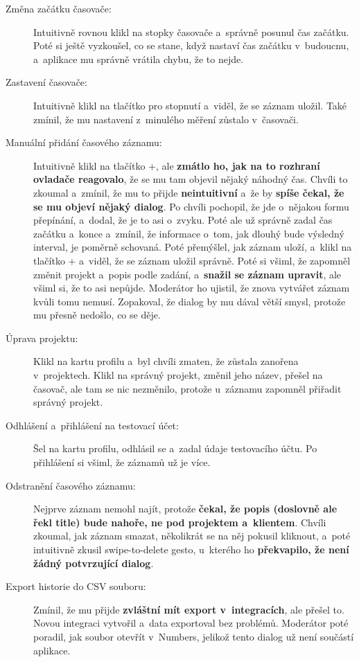 \begin{description}
\item[Změna začátku časovače:] Intuitivně rovnou klikl na stopky časovače a~správně posunul čas začátku. Poté si ještě vyzkoušel, co se stane, když nastaví čas začátku v~budoucnu, a~aplikace mu správně vrátila chybu, že to nejde.
\item[Zastavení časovače:] Intuitivně klikl na tlačítko pro stopnutí a~viděl, že se záznam uložil. Také zmínil, že mu nastavení z~minulého měření zůstalo v~časovači.
\item[Manuální přidání časového záznamu:] Intuitivně klikl na tlačítko +, ale \textbf{zmátlo ho, jak na to rozhraní ovladače reagovalo}, že se mu tam objevil nějaký náhodný čas. Chvíli to zkoumal a~zmínil, že mu to přijde \textbf{neintuitivní} a~že by \textbf{spíše čekal, že se mu objeví nějaký dialog}. Po chvíli pochopil, že jde o~nějakou formu přepínání, a~dodal, že je to asi o~zvyku. Poté ale už správně zadal čas začátku a~konce a~zmínil, že informace o~tom, jak dlouhý bude výsledný interval, je poměrně schovaná. Poté přemýšlel, jak záznam uloží, a~klikl na tlačítko + a~viděl, že se záznam uložil správně. Poté si všiml, že zapomněl změnit projekt a~popis podle zadání, a~\textbf{snažil se záznam upravit}, ale všiml si, že to asi nepůjde. Moderátor ho ujistil, že znova vytvářet záznam kvůli tomu nemusí. Zopakoval, že dialog by mu dával větší smysl, protože mu přesně nedošlo, co se děje.
\item[Úprava projektu:] Klikl na kartu profilu a~byl chvíli zmaten, že zůstala zanořena v~projektech. Klikl na správný projekt, změnil jeho název, přešel na časovač, ale tam se nic nezměnilo, protože u~záznamu zapomněl přiřadit správný projekt. 
\item[Odhlášení a~přihlášení na testovací účet:] Šel na kartu profilu, odhlásil se a~zadal údaje testovacího účtu. Po přihlášení si všiml, že záznamů už je více.
\item[Odstranění časového záznamu:] Nejprve záznam nemohl najít, protože \textbf{čekal, že popis (doslovně ale řekl title) bude nahoře, ne pod projektem a~klientem}. Chvíli zkoumal, jak záznam smazat, několikrát se na něj pokusil kliknout, a~poté intuitivně zkusil swipe-to-delete gesto, u~kterého ho \textbf{překvapilo, že není žádný potvrzující dialog}.
\item[Export historie do CSV souboru:] Zmínil, že mu přijde \textbf{zvláštní mít export v~integracích}, ale přešel to. Novou integraci vytvořil a~data exportoval bez problémů. Moderátor poté poradil, jak soubor otevřít v~Numbers, jelikož tento dialog už není součástí aplikace.

\end{description}
